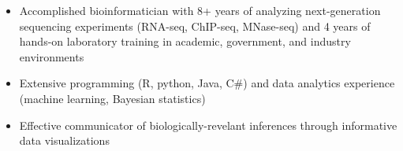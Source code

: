 

\begin{resentries}

\vspace{-2mm}

\begin{itemize}[leftmargin=*]
	\setlength{\itemsep}{-1.5mm}
	\item{Accomplished bioinformatician with 8+ years of analyzing next-generation sequencing experiments (RNA-seq, ChIP-seq, MNase-seq) and 4 years of hands-on laboratory training in academic, government, and industry environments}
	\item{Extensive programming (R, python, Java, C\#) and data analytics experience (machine learning, Bayesian statistics)}
	\item{Effective communicator of biologically-revelant inferences through informative data visualizations}

\end{itemize}

\end{resentries}
